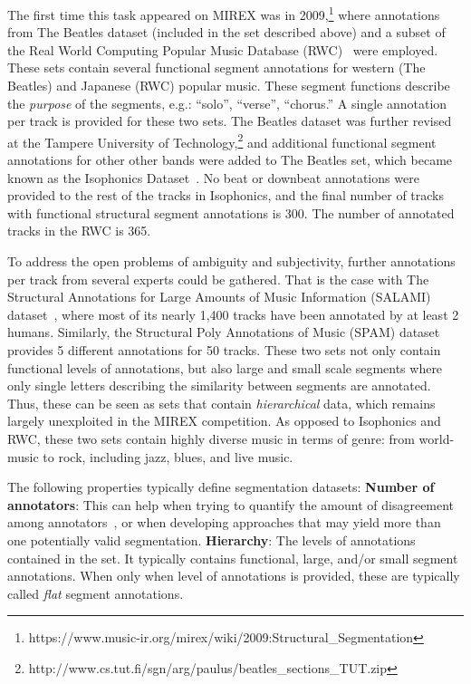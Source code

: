 \documentclass{article}
\begin{document}
The first time this task appeared on MIREX was in 2009,\footnote{https://www.music-ir.org/mirex/wiki/2009:Structural\_Segmentation} where annotations from The Beatles dataset (included in the set described above) and a subset of the Real World Computing Popular Music Database (RWC)~\cite{Goto2002} were employed.
These sets contain several functional segment annotations for western (The Beatles) and Japanese (RWC) popular music.
These segment functions describe the \emph{purpose} of the segments, e.g.: ``solo'', ``verse'', ``chorus.''
A single annotation per track is provided for these two sets.
The Beatles dataset was further revised at the Tampere University of Technology,\footnote{http://www.cs.tut.fi/sgn/arg/paulus/beatles\_sections\_TUT.zip} and additional functional segment annotations for other other bands were added to The Beatles set, which became known as the Isophonics Dataset~\cite{Mauch2009a}.
No beat or downbeat annotations were provided to the rest of the tracks in Isophonics, and the final number of tracks with functional structural segment annotations is 300.
The number of annotated tracks in the RWC is 365.

To address the open problems of ambiguity and subjectivity, further annotations per track from several experts could be gathered.
That is the case with The Structural Annotations for Large Amounts of Music Information (SALAMI) dataset~\cite{Smith2011}, where most of its nearly 1,400 tracks have been annotated by at least 2 humans.
Similarly, the Structural Poly Annotations of Music (SPAM) dataset~\cite{Nieto2016} provides 5 different annotations for 50 tracks.
These two sets not only contain functional levels of annotations, but also large and small scale segments where only single letters describing the similarity between segments are annotated.
Thus, these can be seen as sets that contain \emph{hierarchical} data, which remains largely unexploited in the MIREX competition.
As opposed to Isophonics and RWC, these two sets contain highly diverse music in terms of genre: from world-music to rock, including jazz, blues, and live music.

The following properties typically define segmentation datasets:
\textbf{Number of annotators}: This can help when trying to quantify the amount of disagreement among annotators~\cite{McFee2017,Nieto2016}, or when developing approaches that may yield more than one potentially valid segmentation.
\textbf{Hierarchy}: The levels of annotations contained in the set. It typically contains functional, large, and/or small segment annotations.
When only when level of annotations is provided, these are typically called \emph{flat} segment annotations.
\end{document}
